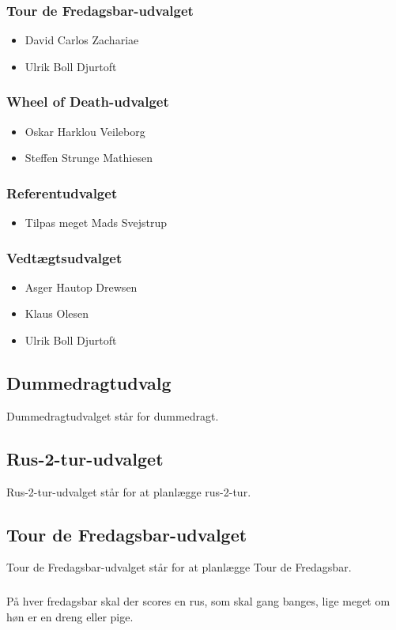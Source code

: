 \documentclass{article}
\begin{document}
	\subsubsection{Tour de Fredagsbar-udvalget}
	\begin{itemize}
		\item David Carlos Zachariae
		\item Ulrik Boll Djurtoft
	\end{itemize}
	\subsubsection{Wheel of Death-udvalget}
	\begin{itemize}
		\item Oskar Harklou Veileborg
		\item Steffen Strunge Mathiesen
	\end{itemize}
	\subsubsection{Referentudvalget}
	\begin{itemize}
		\item Tilpas meget Mads Svejstrup
	\end{itemize}
	\subsubsection{Vedtægtsudvalget}
	\begin{itemize}
		\item Asger Hautop Drewsen
		\item Klaus Olesen
		\item Ulrik Boll Djurtoft
	\end{itemize}
	
	\subsection{Dummedragtudvalg}
	Dummedragtudvalget står for dummedragt.
	\subsection{Rus-2-tur-udvalget}
	Rus-2-tur-udvalget står for at planlægge rus-2-tur.
	\subsection{Tour de Fredagsbar-udvalget}
	Tour de Fredagsbar-udvalget står for at planlægge Tour de Fredagsbar.
	\subsubsection{}
	På hver fredagsbar skal der scores en rus, som skal gang banges, lige meget om høn er en dreng eller pige.
\end{document}
